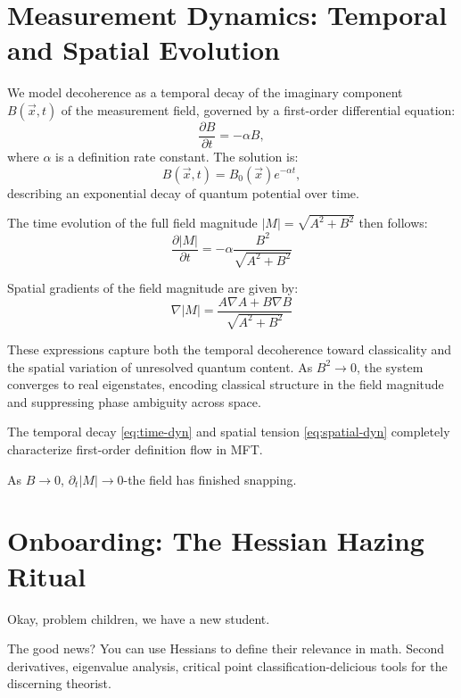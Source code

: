 \section{Measurement Dynamics: Temporal and Spatial Evolution}

We model decoherence as a temporal decay of the imaginary component \(B(\vec{x}, t)\) of the measurement field, governed by a first-order differential equation:
\[
\frac{\partial B}{\partial t} = -\alpha B,
\]
where \(\alpha\) is a definition rate constant. The solution is:
\[
B(\vec{x}, t) = B_0(\vec{x}) e^{-\alpha t},
\]
describing an exponential decay of quantum potential over time.

The time evolution of the full field magnitude \( |M| = \sqrt{A^2 + B^2} \) then follows:
\begin{equation}
  \frac{\partial |M|}{\partial t} = -\alpha\frac{B^2}{\sqrt{A^2+B^2}} \label{eq:time-dyn}
\end{equation}

Spatial gradients of the field magnitude are given by:
\begin{equation}
  \nabla |M| = \frac{A\nabla A + B\nabla B}{\sqrt{A^2+B^2}} \label{eq:spatial-dyn}
\end{equation}

These expressions capture both the temporal decoherence toward classicality and the spatial variation of unresolved quantum content. As \(B^2 \to 0\), the system converges to real eigenstates, encoding classical structure in the field magnitude and suppressing phase ambiguity across space.

\begin{theorem}
  The temporal decay \eqref{eq:time-dyn} and spatial tension \eqref{eq:spatial-dyn} completely characterize first-order definition flow in MFT.
\end{theorem}

As $B \to 0$, $\partial_t|M| \to 0$-the field has finished snapping.

\section*{Onboarding: The Hessian Hazing Ritual}

Okay, problem children, we have a new student.

The good news? You can use Hessians to define their relevance in math. Second derivatives, eigenvalue analysis, critical point classification-delicious tools for the discerning theorist.

